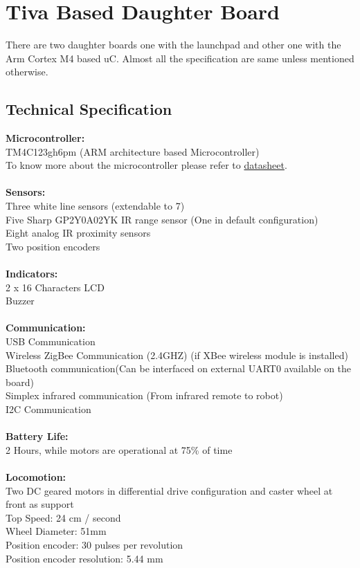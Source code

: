 \documentclass[a4paper,10pt,oneside]{article}
\begin{document}
{	\section{\Huge\textbf{Tiva Based Daughter Board}}
		{There are two daughter boards one with the launchpad and other one with the Arm Cortex M4 based uC. Almost all the specification are same unless mentioned otherwise.\\}
		\subsection{{\huge \textbf{Technical Specification}}\\}
			{\textbf{Microcontroller:\\}
			TM4C123gh6pm (ARM architecture based Microcontroller)\\ To know more about the microcontroller please refer to \href{www.ti.com/lit/gpn/tm4c123gh6pm}{datasheet}.\\ \\}
			{\textbf{Sensors:}\\
			Three white line sensors (extendable to 7)\\
			Five Sharp GP2Y0A02YK IR range sensor (One in default configuration)\\
			Eight analog IR proximity sensors\\
			Two position encoders\\\\} 
			\textbf{Indicators:\\}
			{2 x 16 Characters LCD\\
			Buzzer\\\\}
			\textbf{Communication:\\}
			{USB Communication\\
			Wireless ZigBee Communication (2.4GHZ) (if XBee wireless module is installed)\\
			Bluetooth communication(Can be interfaced on external UART0 available on the board)\\
			Simplex infrared communication (From infrared remote to robot)\\
			I2C Communication \\\\}
			\textbf{Battery Life:\\}
			{2 Hours, while motors are operational at 75\% of time\\\\}
			\textbf{Locomotion:\\}
			{Two DC geared motors in differential drive configuration and caster wheel at front as support\\
			Top Speed: 24 cm / second\\
			Wheel Diameter: 51mm\\
			Position encoder: 30 pulses per revolution\\
			Position encoder resolution: 5.44 mm\\\\}
}
\end{document}
